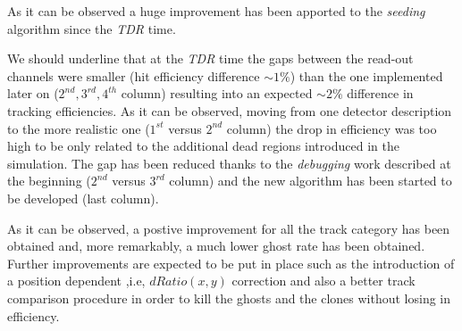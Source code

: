 \documentclass[paper=a4, fontsize=10pt]{scrartcl}
\numberwithin{equation}{section}		%
\numberwithin{figure}{section}			%
\numberwithin{table}{section}				%
\begin{document}
As it can be observed a huge improvement has been apported to the \textit{seeding} algorithm since the \textit{TDR} time. 

We should underline that at the \textit{TDR} time the gaps between the read-out channels were smaller (hit efficiency difference $\sim 1\%$) than the one implemented later on ($2^{nd},3^{rd},4^{th}$ column) resulting into an expected $\sim 2 \%$ difference in tracking efficiencies. As it can be observed, moving from one detector description to the more realistic one ($1^{st}$ versus $2^{nd}$ column) the drop in efficiency was too high to be only related to the additional dead regions introduced in the simulation. The gap has been reduced thanks to the \textit{debugging} work described at the beginning ($2^{nd}$ versus $3^{rd}$ column) and the new algorithm has been started to be developed (last column). 

As it can be observed, a postive improvement for all the track category has been obtained and, more remarkably, a much lower ghost rate has been obtained. Further improvements are expected to be put in place such as the introduction of a position dependent ,i.e, $dRatio(x,y)$ correction and also a better track comparison procedure in order to kill the ghosts and the clones without losing in efficiency.

\end{document}
